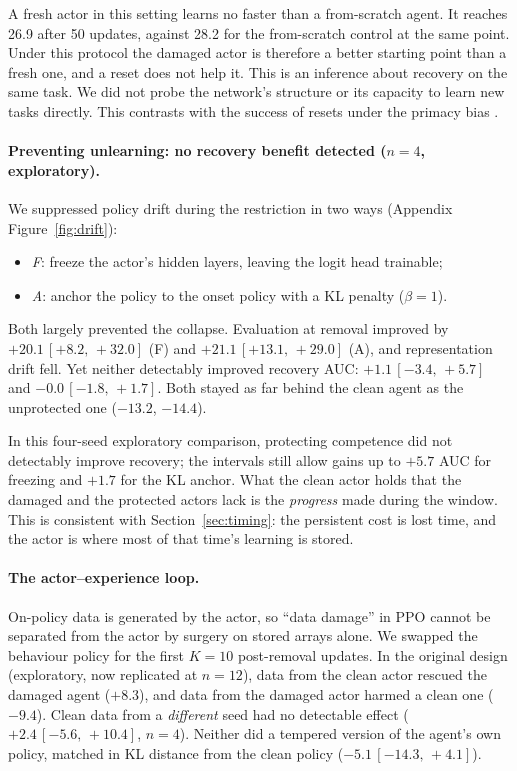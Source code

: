 \documentclass[10pt]{article} %
\newcommand{\ci}[2]{\,[#1,\,#2]}
\begin{document}
A fresh actor in this setting learns no faster than a from-scratch agent. It reaches 26.9 after 50 updates, against 28.2 for the from-scratch control at the same point. Under this protocol the damaged actor is therefore a better starting point than a fresh one, and a reset does not help it. This is an inference about recovery on the same task. We did not probe the network's structure or its capacity to learn new tasks directly. This contrasts with the success of resets under the primacy bias \citep{nikishin2022primacy}.

\paragraph{Preventing unlearning: no recovery benefit detected ($n=4$, exploratory).}
We suppressed policy drift during the restriction in two ways (Appendix Figure~\ref{fig:drift}):
\begin{itemize}
\item \emph{F}: freeze the actor's hidden layers, leaving the logit head trainable;
\item \emph{A}: anchor the policy to the onset policy with a KL penalty ($\beta=1$).
\end{itemize}
Both largely prevented the collapse. Evaluation at removal improved by $+20.1\ci{+8.2}{+32.0}$ (F) and $+21.1\ci{+13.1}{+29.0}$ (A), and representation drift fell. Yet neither detectably improved recovery AUC: $+1.1\ci{-3.4}{+5.7}$ and $-0.0\ci{-1.8}{+1.7}$. Both stayed as far behind the clean agent as the unprotected one ($-13.2$, $-14.4$).

In this four-seed exploratory comparison, protecting competence did not detectably improve recovery; the intervals still allow gains up to $+5.7$ AUC for freezing and $+1.7$ for the KL anchor. What the clean actor holds that the damaged and the protected actors lack is the \emph{progress} made during the window. This is consistent with Section~\ref{sec:timing}: the persistent cost is lost time, and the actor is where most of that time's learning is stored.

\paragraph{The actor--experience loop.}
On-policy data is generated by the actor, so ``data damage'' in PPO cannot be separated from the actor by surgery on stored arrays alone. We swapped the behaviour policy for the first $K=10$ post-removal updates. In the original design (exploratory, now replicated at $n=12$), data from the clean actor rescued the damaged agent ($+8.3$), and data from the damaged actor harmed a clean one ($-9.4$). Clean data from a \emph{different} seed had no detectable effect ($+2.4\ci{-5.6}{+10.4}$, $n=4$). Neither did a tempered version of the agent's own policy, matched in KL distance from the clean policy ($-5.1\ci{-14.3}{+4.1}$).
\end{document}
